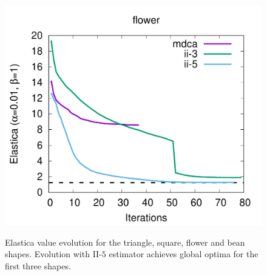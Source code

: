 \begin{figure}[h!]
{\includegraphics[scale=0.4]{figures/chapter5/exhaustive-selection/plot-shape-estimator/flower.pdf}
}\hspace{1em}%
%
\caption{Elastica value evolution for the triangle, square, flower and bean shapes. Evolution with II-$5$ estimator achieves global optima for the first three shapes.}
\label{fig:local-comb-plots}
\end{figure}

